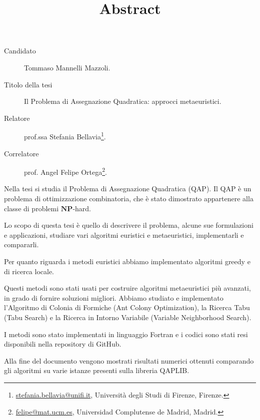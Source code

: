 \documentclass[a4paper,openright, oneside]{scrartcl}
\date{}
\title{Abstract}
\begin{document}
\maketitle
\begin{description}
	\item[Candidato] Tommaso Mannelli Mazzoli.
	\item[Titolo della tesi] Il Problema di Assegnazione Quadratica: approcci metaeuristici.
	\item[Relatore] prof.ssa Stefania Bellavia\footnote{\url{stefania.bellavia@unifi.it}, Università degli Studi di Firenze, Firenze.}.
	\item[Correlatore] prof. Angel Felipe Ortega\footnote{\url{felipe@mat.ucm.es}, Universidad Complutense de Madrid, Madrid.}.
\end{description}


Nella tesi si studia il Problema di Assegnazione Quadratica (QAP). Il QAP è un problema di ottimizzazione combinatoria, che è stato dimostrato appartenere alla classe di problemi $\mathbf{NP}$-hard.

Lo scopo di questa tesi è quello di descrivere il problema, alcune sue formulazioni e applicazioni, studiare vari algoritmi euristici e metaeuristici, implementarli e compararli.

Per quanto riguarda i metodi euristici abbiamo implementato algoritmi greedy e di ricerca locale.

Questi metodi sono stati usati per costruire algoritmi metaeuristici più avanzati, in grado di fornire soluzioni migliori. Abbiamo studiato e implementato l'Algoritmo di Colonia di Formiche (Ant Colony Optimization), la Ricerca Tabu (Tabu Search) e la Ricerca in Intorno Variabile (Variable Neighborhood Search).

I metodi sono stato implementati in linguaggio Fortran e i codici sono stati resi disponibili nella repository di GitHub.

Alla fine del documento vengono mostrati risultati numerici ottenuti comparando gli algoritmi su varie istanze presenti sulla libreria QAPLIB.
\end{document}
